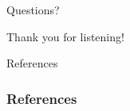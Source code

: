 \documentclass[12pt,mathserif]{beamer}
\begin{document}
\begin{frame}[plain]
\centerline{Questions?}
\end{frame}

\begin{frame}[plain]
\centerline{Thank you for listening!}
\end{frame}

\begin{frame}[allowframebreaks]{References}
\frametitle{References}
\nocite{*}


\end{frame}
\end{document}
